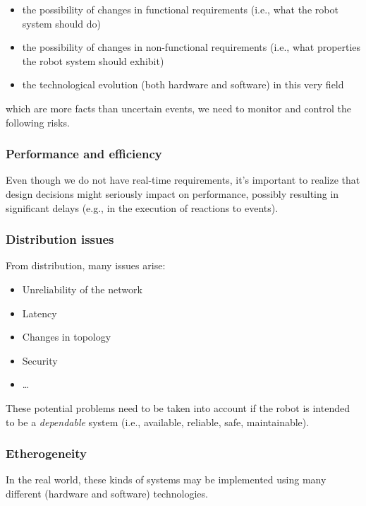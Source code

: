 \documentclass[11pt]{article}
\begin{document}
 \begin{itemize}
   \item the possibility of changes in functional requirements (i.e., what the
   robot system should do)
   \item the possibility of changes in non-functional requirements (i.e., what
   properties the robot system should exhibit)
   \item the technological evolution (both hardware and software) in this very
   field
 \end{itemize} 
 
 which are more facts than uncertain events, we need to monitor and control the 
  following risks.
  
 \subsubsection{Performance and efficiency}
 
 Even though we do not have real-time requirements, it's important to realize
   that design decisions might seriously impact on performance, possibly
   resulting in significant delays (e.g., in the execution of reactions to
   events).
   
  \subsubsection{Distribution issues}
  
 From distribution, many issues arise:
 
\begin{itemize}
  \item Unreliability of the network
  \item Latency
  \item Changes in topology
  \item Security
  \item \ldots
\end{itemize}

  These potential problems need to be taken into account if 
   the robot is intended to be a \emph{dependable} system (i.e., available,
   reliable, safe, maintainable).

\subsubsection{Etherogeneity}
  
In the real world, these kinds of systems may be implemented using many
  different (hardware and software) technologies.
 
\end{document}
